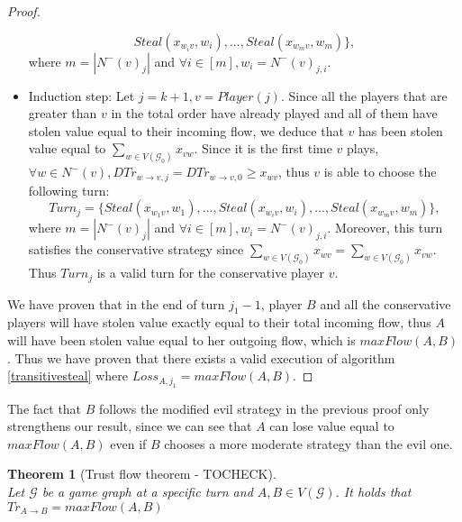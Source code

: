 \documentclass[11pt]{article}
\newtheorem{theorem}{Theorem}[section]
\theoremstyle{definition}
\theoremstyle{corollary}
\theoremstyle{lemma}
\begin{document}
\begin{proof}
\begin{itemize}
$$          Steal(x_{w_iv}, w_i), ..., Steal(x_{w_mv}, w_m)\},$$ where $m = |N^{-}(v)_j|$ and $\forall i \in [m], w_i =
          N^{-}(v)_{j, i}$.
          \item Induction step: Let $j = k + 1, v = Player(j)$. Since all the players that are greater than $v$ in the total
          order have already played and all of them have stolen value equal to their incoming flow, we deduce that $v$ has
          been stolen value equal to $\sum\limits_{w \in V(\mathcal{G}_0)}x_{vw}$. Since it is the first time $v$ plays,
          $\forall w \in N^{-}(v), DTr_{w \rightarrow v, j} = DTr_{w \rightarrow v, 0} \geq x_{wv}$, thus $v$ is able to
          choose the following turn: $$Turn_j = \{Steal(x_{w_1v}, w_1), ..., Steal(x_{w_iv}, w_i), ...,
          Steal(x_{w_mv}, w_m)\},$$ where $m = |N^{-}(v)_j|$ and $\forall i \in [m], w_i = N^{-}(v)_{j, i}$. Moreover, this
          turn satisfies the conservative strategy since $\sum\limits_{w \in V(\mathcal{G}_0)}x_{wv} = \sum\limits_{w \in
          V(\mathcal{G}_0)}x_{vw}$. Thus $Turn_j$ is a valid turn for the conservative player $v$.
       \end{itemize}
       We have proven that in the end of turn $j_1 - 1$, player $B$ and all the conservative players will have stolen value
       exactly equal to their total incoming flow, thus $A$ will have been stolen value equal to her outgoing flow, which is
       $maxFlow(A, B)$. Thus we have proven that there exists a valid execution of algorithm \ref{transitivesteal} where
       $Loss_{A, j_1} = maxFlow(A, B)$.
    \end{proof}
    The fact that $B$ follows the modified evil strategy in the previous proof only strengthens our result, since we can see
    that $A$ can lose value equal to $maxFlow(A, B)$ even if $B$ chooses a more moderate strategy than the evil one.
    \begin{theorem}[Trust flow theorem - TOCHECK] \ \\
    \label{trustflow}
       Let $\mathcal{G}$ be a game graph at a specific turn and $A, B \in V(\mathcal{G})$. It holds that
       $Tr_{A \rightarrow B} = maxFlow(A, B)$
    \end{theorem}
\end{document}
